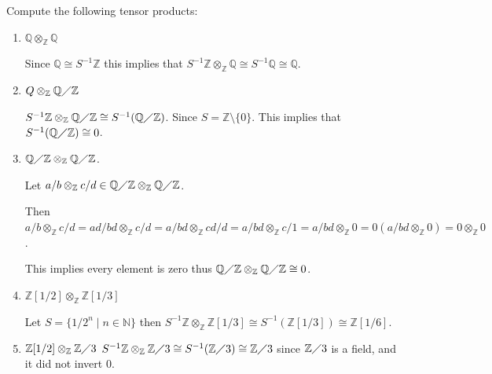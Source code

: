 \documentclass[12pt, letterpaper]{article}
\newcommand{\Q}{\mathbb{Q}}
\newcommand{\Z}{\mathbb{Z}}
\newcommand{\N}{\mathbb{N}}
\begin{document}
\begin{problem}{}
    Compute the following tensor products:
\end{problem}
\begin{problemproof}
    \begin{enumerate}
        \item $\Q \otimes_\Z \Q$
        
        Since $\Q \cong S^{-1}\Z$ this implies that $S^{-1}\Z \otimes_\Z \Q \cong S^{-1}\Q \cong \Q$.
        \item $Q \otimes_\Z \Q \diagup \Z$
        
        $S^{-1}\Z \otimes_\Z \Q \diagup \Z \cong S^{-1}(\Q \diagup \Z)$. Since $S= \Z \setminus \{0\}$. This implies that $S^{-1}(\Q \diagup \Z) \cong 0$.
        \item $\Q \diagup \Z \otimes_\Z \Q \diagup \Z$.
        
        Let $a/b \otimes_{\Z} c/d \in \Q \diagup \Z \otimes_\Z \Q \diagup \Z$.

        Then $a/b \otimes_{\Z} c/d = ad/bd \otimes_{\Z} c/d = a/bd \otimes_{\Z} cd/d = a/bd \otimes_{\Z} c/1 = a/bd \otimes_{\Z} 0 = 0(a/bd \otimes_{\Z} 0) = 0 \otimes_{\Z} 0$.

        This implies every element is zero thus $\Q \diagup \Z \otimes_{\Z} \Q \diagup \Z \cong 0$.

        \item $\Z[1/2] \otimes_\Z \Z[1/3]$
        
        Let $S=\{1/2^n \mid n \in \N\}$ then $S^{-1}\Z \otimes_{\Z} \Z[1/3] \cong S^{-1}(\Z[1/3]) \cong \Z[1/6]$.
        \item $\Z[1/2] \otimes_\Z \Z \diagup 3$
        $S^{-1}\Z \otimes_\Z \Z \diagup 3 \cong S^{-1} (\Z \diagup 3) \cong \Z \diagup 3$ since $\Z \diagup 3$ is a field, and it did not invert 0.
    \end{enumerate}
\end{problemproof}
\end{document}
